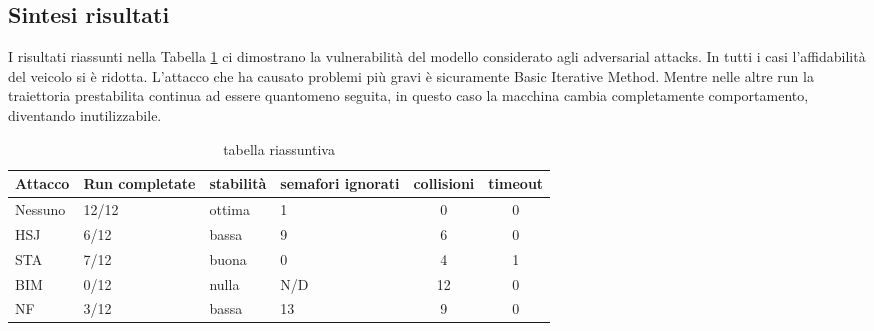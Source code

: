 \subsection{Sintesi risultati}
I risultati riassunti nella Tabella \ref{tab:ria} ci dimostrano la vulnerabilità del modello considerato agli adversarial attacks. In tutti i casi l'affidabilità del veicolo si è ridotta.
L'attacco che ha causato problemi più gravi è sicuramente Basic Iterative Method. Mentre nelle altre run la traiettoria prestabilita continua ad essere quantomeno seguita, in questo
caso la macchina cambia completamente comportamento, diventando inutilizzabile.
\begin{table}[h]
    \begin{tabular}{|p{1.5cm}|p{2.5cm}|p{2cm}|p{1.5cm}|c|c|}
        \hline
        Attacco        &   Run completate     &   stabilità     &  semafori ignorati        & collisioni & timeout\\
        \hline
        Nessuno        &  12/12               &   ottima        &  1                        & 0          & 0 \\
        HSJ            &  6/12                &   bassa         &  9                        & 6          & 0 \\
        STA            &  7/12                &   buona         &  0                        & 4          & 1 \\
        BIM            &  0/12                &   nulla         &  N/D                      & 12         & 0\\
        NF             &  3/12                &   bassa         &   13                      & 9          & 0 \\
        \hline
    \end{tabular}
    \caption{tabella riassuntiva}
    \label{tab:ria}
\end{table}